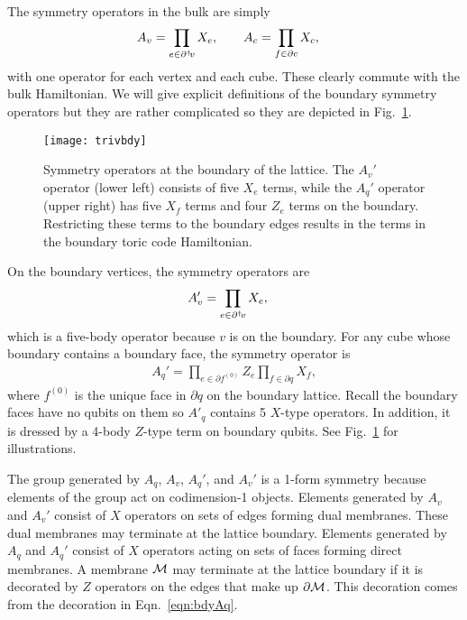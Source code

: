 The symmetry operators in the bulk are simply 
\begin{align}
A_v &= \prod_{e\in\pardag v} X_e,\qquad A_c = \prod_{f\in \partial c}X_c,
\end{align}
with one operator for each vertex and each cube. These clearly commute with the bulk Hamiltonian. We will give explicit definitions of the boundary symmetry operators but they are rather complicated so they are depicted  in Fig.~\ref{fig:trivbdy}.

\begin{figure}
\centering
\texttt{[image: trivbdy]}
\caption[Symmetry operators at the boundary of the lattice]{Symmetry operators at the boundary of the lattice. The $A_v'$ operator (lower left) consists of five $X_e$ terms, while the $A_q'$ operator (upper right) has five $X_f$ terms and four $Z_e$ terms on the boundary. Restricting these terms to the boundary edges results in the terms in the boundary toric code Hamiltonian.}
\label{fig:trivbdy}
\end{figure}

On the boundary vertices, the symmetry operators are 
\begin{align}
A_v' &= \prod_{e\in\pardag v} X_e,
\end{align}
which is a five-body operator because $v$ is on the boundary.
For any cube whose boundary contains a boundary face, the symmetry operator is
\begin{align}
A_q' = \prod_{e\in \partial f^{(0)}}Z_e\prod_{f\in \partial q}X_f,\label{eqn:bdyAq}
\end{align}
where $f^{(0)}$ is the unique face in $\partial q$ on the boundary lattice. Recall the boundary faces have no qubits on them so $A'_q$ contains 5 $X$-type operators. In addition, it is dressed by a 4-body $Z$-type term on boundary qubits. See Fig.~\ref{fig:trivbdy} for illustrations.

The group generated by $A_q$, $A_v$, $A_q'$, and $A_v'$ is a 1-form symmetry because elements of the group act on codimension-1 objects. Elements generated by $A_v$ and $A_v'$ consist of $X$ operators on sets of edges forming dual membranes. These dual membranes may terminate at the lattice boundary.
Elements generated by $A_q$ and $A_q'$ consist of $X$ operators acting on sets of faces forming direct membranes. A membrane $\cal{M}$ may terminate at the lattice boundary if it is decorated by $Z$ operators on the edges that make up $\partial\cal{M}$. This decoration comes from the decoration in Eqn.~\ref{eqn:bdyAq}.

